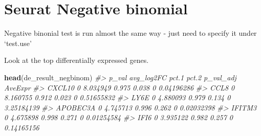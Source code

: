 \documentclass[
]{book}
\newenvironment{Shaded}{\begin{snugshade}}{\end{snugshade}}
\newcommand{\AttributeTok}[1]{\textcolor[rgb]{0.13,0.29,0.53}{#1}}
\newcommand{\CommentTok}[1]{\textcolor[rgb]{0.56,0.35,0.01}{\textit{#1}}}
\newcommand{\DecValTok}[1]{\textcolor[rgb]{0.00,0.00,0.81}{#1}}
\newcommand{\FunctionTok}[1]{\textcolor[rgb]{0.13,0.29,0.53}{\textbf{#1}}}
\newcommand{\NormalTok}[1]{#1}
\newcommand{\OtherTok}[1]{\textcolor[rgb]{0.56,0.35,0.01}{#1}}
\newcommand{\SpecialCharTok}[1]{\textcolor[rgb]{0.81,0.36,0.00}{\textbf{#1}}}
\newcommand{\StringTok}[1]{\textcolor[rgb]{0.31,0.60,0.02}{#1}}
\begin{document}
\hypertarget{seurat-negative-binomial}{%
\section{Seurat Negative binomial}\label{seurat-negative-binomial}}

Negative binonial test is run almost the same way - just need to specify it under `test.use'

\begin{Shaded}
\end{Shaded}

Look at the top differentially expressed genes.

\begin{Shaded}
\begin{Highlighting}[]
\FunctionTok{head}\NormalTok{(de\_result\_negbinom)}
\CommentTok{\#\textgreater{}          p\_val avg\_log2FC pct.1 pct.2 p\_val\_adj    AveExpr}
\CommentTok{\#\textgreater{} CXCL10       0   8.034949 0.975 0.038         0 0.04196286}
\CommentTok{\#\textgreater{} CCL8         0   8.160755 0.912 0.023         0 0.51655832}
\CommentTok{\#\textgreater{} LY6E         0   4.880093 0.979 0.134         0 3.25184139}
\CommentTok{\#\textgreater{} APOBEC3A     0   4.745713 0.996 0.262         0 0.02032398}
\CommentTok{\#\textgreater{} IFITM3       0   4.675898 0.998 0.271         0 0.01254584}
\CommentTok{\#\textgreater{} IFI6         0   3.935122 0.982 0.257         0 0.14165156}
\end{Highlighting}
\end{Shaded}
\end{document}
